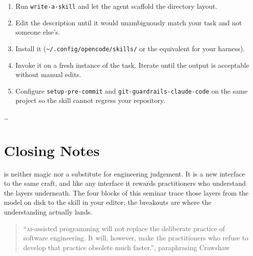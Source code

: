 \documentclass{../sharedAssets/tufte}
\begin{document}
\begin{enumerate}
  \item Run \texttt{write-a-skill} and let the agent scaffold the
        directory layout.
  \item Edit the description until it would unambiguously match
        your task and not someone else's.
  \item Install it (\texttt{\textasciitilde/.config/opencode/skills/}
        or the equivalent for your harness).
  \item Invoke it on a fresh instance of the task. Iterate until the
        output is acceptable without manual edits.
  \item Configure \texttt{setup-pre-commit} and
        \texttt{git-guardrails-claude-code} on the same project so the
        skill cannot regress your repository.
\end{enumerate}


\vspace{1em}
\dots

\chapter*{Closing Notes}

 is neither magic nor a substitute for
engineering judgement. It is a new interface to the same craft,
and like any interface it rewards practitioners who understand the
layers underneath. The four blocks of this seminar trace those layers
from the model on disk to the skill in your editor; the breakouts are
where the understanding actually lands.

\begin{quote}
``\textsc{ai}-assisted programming will not replace the deliberate
practice of software engineering. It will, however, make the
practitioners who refuse to develop that practice obsolete much
faster.'', paraphrasing Crawshaw\cite{crawshaw2024sketch}
\end{quote}

\end{document}
